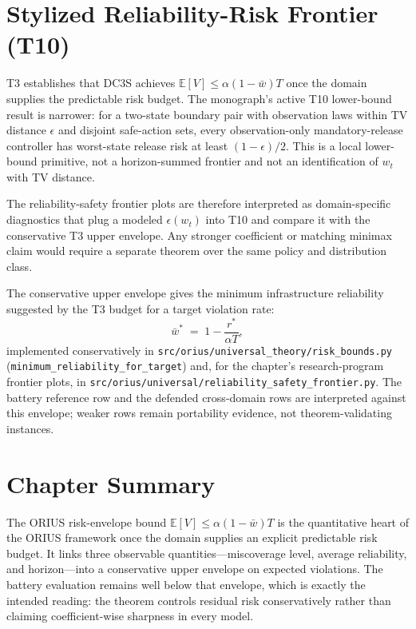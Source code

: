\section{Stylized Reliability-Risk Frontier (T10)}
\label{sec:t10-lower-bound-ch18}

T3 establishes that DC3S achieves $\mathbb{E}[V] \le \alpha(1-\bar{w})T$ once
the domain supplies the predictable risk budget.  The monograph's active T10
lower-bound result is narrower: for a two-state boundary pair with observation
laws within TV distance \(\epsilon\) and disjoint safe-action sets, every
observation-only mandatory-release controller has worst-state release risk at
least \((1-\epsilon)/2\).  This is a local lower-bound primitive, not a
horizon-summed frontier and not an identification of \(w_t\) with TV distance.

The reliability-safety frontier plots are therefore interpreted as
domain-specific diagnostics that plug a modeled \(\epsilon(w_t)\) into T10 and
compare it with the conservative T3 upper envelope.  Any stronger coefficient
or matching minimax claim would require a separate theorem over the same policy
and distribution class.

The conservative upper envelope gives the minimum infrastructure reliability
suggested by the T3 budget for a target violation rate:
\[
  \bar{w}^* \;=\; 1 - \frac{r^*}{\alpha T},
\]
implemented conservatively in
\texttt{src/orius/universal\_theory/risk\_bounds.py}
(\texttt{minimum\_reliability\_for\_target}) and, for the chapter's
research-program frontier plots, in
\texttt{src/orius/universal/reliability\_safety\_frontier.py}.  The battery
reference row and the defended cross-domain rows are interpreted against this
envelope; weaker rows remain portability evidence, not theorem-validating
instances.

\section{Chapter Summary}

The ORIUS risk-envelope bound $\mathbb{E}[V] \le \alpha(1 - \bar{w})T$ is the
quantitative heart of the ORIUS framework once the domain supplies an
explicit predictable risk budget.  It links three observable
quantities---miscoverage level, average reliability, and horizon---into
a conservative upper envelope on expected violations.  The battery
evaluation remains well below that envelope, which is exactly the intended
reading: the theorem controls residual risk conservatively rather than
claiming coefficient-wise sharpness in every model.

\begingroup
\def\domainblockid{t3}
\def\domainblocktitle{T3}
\endgroup

